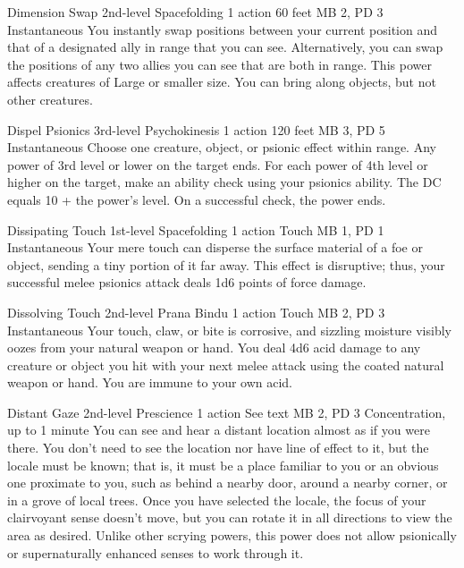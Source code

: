 \DndPowerHeader%
  {Dimension Swap}
  {2nd-level Spacefolding}
  {1 action}
  {60 feet}
  {MB 2, PD 3}
  {Instantaneous}
  You instantly swap positions between your current position
  and that of a designated ally in range that you can see.
  Alternatively, you can swap the positions of
  any two allies you can see that are both in range.
  This power affects creatures of Large or smaller size.
  You can bring along objects, but not other creatures.

\DndPowerHeader%
  {Dispel Psionics}
  {3rd-level Psychokinesis}
  {1 action}
  {120 feet}
  {MB 3, PD 5}
  {Instantaneous}
  Choose one creature, object, or psionic effect within range.
  Any power of 3rd level or lower on the target ends.
  For each power of 4th level or higher on the target,
  make an ability check using your psionics ability.
  The DC equals 10 + the power's level.
  On a successful check, the power ends.

\DndPowerHeader%
  {Dissipating Touch}
  {1st-level Spacefolding}
  {1 action}
  {Touch}
  {MB 1, PD 1}
  {Instantaneous}
Your mere touch can disperse the surface material of a foe or object,
sending a tiny portion of it far away.
This effect is disruptive; thus,
your successful melee psionics attack deals 1d6 points of force damage.

\DndPowerHeader%
  {Dissolving Touch}
  {2nd-level Prana Bindu}
  {1 action}
  {Touch}
  {MB 2, PD 3}
  {Instantaneous}
  Your touch, claw, or bite is corrosive,
  and sizzling moisture visibly oozes from your
  natural weapon or hand.
  You deal 4d6 acid damage to any creature or object
  you hit with your next melee attack using the coated
  natural weapon or hand.
  You are immune to your own acid.

  \DndPowerHeader%
  {Distant Gaze}
  {2nd-level Prescience}
  {1 action}
  {See text}
  {MB 2, PD 3}
  {Concentration, up to 1 minute}
  You can see and hear a distant location
  almost as if you were there.
  You don't need to see the location
  nor have line of effect to it,
  but the locale must be known;
  that is, it must be
  a place familiar to you or an obvious one
  proximate to you,
  such as behind a nearby door,
  around a nearby corner,
  or in a grove of local trees.
  Once you have selected the locale,
  the focus of your clairvoyant sense doesn't move,
  but you can rotate it in all directions
  to view the area as desired.
  Unlike other scrying powers,
  this power does not allow psionically or supernaturally
  enhanced senses to work through it.


